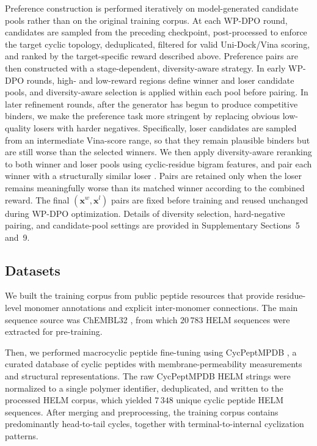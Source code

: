 \begin{methods}
Preference construction is performed iteratively on model-generated candidate pools rather than on the original training corpus.
At each WP-DPO round, candidates are sampled from the preceding \mytool checkpoint, post-processed to enforce the target cyclic topology, deduplicated, filtered for valid Uni-Dock/Vina scoring, and ranked by the target-specific reward described above.
Preference pairs are then constructed with a stage-dependent, diversity-aware strategy.
In early WP-DPO rounds, high- and low-reward regions define winner and loser candidate pools, and diversity-aware selection is applied within each pool before pairing.
In later refinement rounds, after the generator has begun to produce competitive binders, we make the preference task more stringent by replacing obvious low-quality losers with harder negatives.
Specifically, loser candidates are sampled from an intermediate Vina-score range, so that they remain plausible binders but are still worse than the selected winners.
We then apply diversity-aware reranking to both winner and loser pools using cyclic-residue bigram features, and pair each winner with a structurally similar loser \citep{ref_mmr,ref_drugblip}.
Pairs are retained only when the loser remains meaningfully worse than its matched winner according to the combined reward.
The final $(\mathbf{x}^{w},\mathbf{x}^{l})$ pairs are fixed before training and reused unchanged during WP-DPO optimization.
Details of diversity selection, hard-negative pairing, and candidate-pool settings are provided in Supplementary Sections~5 and~9.

\subsection{Datasets}\label{subsec:datasets}

We built the training corpus from public peptide resources that provide residue-level monomer annotations and explicit inter-monomer connections.
The main sequence source was ChEMBL32 \citep{ref_chembl}, from which $20\,783$ HELM sequences were extracted for pre-training.

Then, we performed macrocyclic peptide fine-tuning using \linebreak[4]CycPeptMPDB \citep{ref_cycpeptmpdb}, a curated database of cyclic peptides with membrane-permeability measurements and structural representations.
The raw CycPeptMPDB HELM strings were normalized to a single polymer identifier, deduplicated, and written to the processed HELM corpus, which yielded $7\,348$ unique cyclic peptide HELM sequences.
After merging and preprocessing, the training corpus contains predominantly head-to-tail cycles, together with terminal-to-internal cyclization patterns.


\end{methods}
